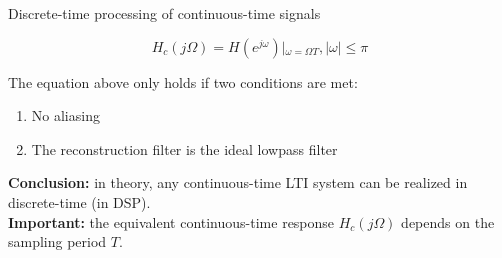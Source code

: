 \documentclass[10pt, handout]{beamer}
\begin{document}
%
\begin{frame}{Discrete-time processing of continuous-time signals}
	\vspace{-0.5cm}
	\begin{center}
		\def\Heff{1}
		\resizebox{\linewidth}{!}{}
	\end{center}
	\pause
	\begin{equation*}
	H_{c}(j\Omega) = H(e^{j\omega})|_{\omega = \Omega T}, |\omega| \leq \pi
	\end{equation*}
	
	The equation above only holds if two conditions are met:
	\begin{enumerate}
		\item No aliasing
		\item The reconstruction filter is the ideal lowpass filter
	\end{enumerate}
	\pause
	\textbf{Conclusion:} in theory, any continuous-time LTI system can be realized in discrete-time (in DSP).\\
	\textbf{Important:} the equivalent continuous-time response $H_{c}(j\Omega)$ depends on the sampling period $T$.
\end{frame}
\end{document}
